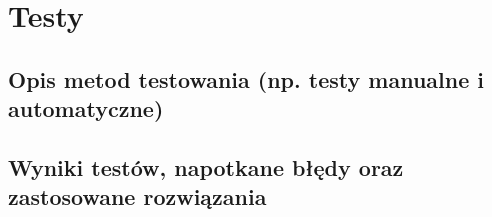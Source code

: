 \documentclass[../../spr.tex]{subfiles}
\begin{document}
\section{Testy}
\subsection{Opis metod testowania (np. testy manualne i automatyczne)}
\subsection{Wyniki testów, napotkane błędy oraz zastosowane rozwiązania}
\end{document}
